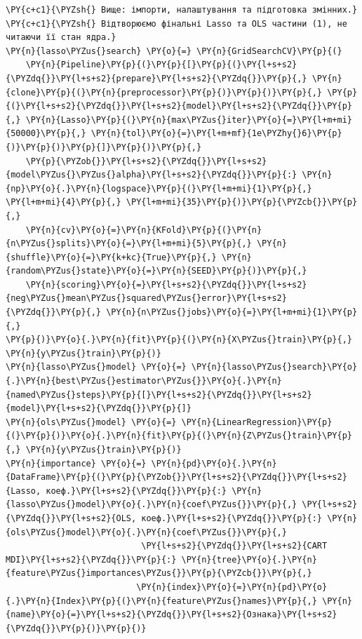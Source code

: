 \begin{Verbatim}[commandchars=\\\{\}]
\PY{c+c1}{\PYZsh{} Вище: імпорти, налаштування та підготовка змінних.}
\PY{c+c1}{\PYZsh{} Відтворюємо фінальні Lasso та OLS частини (1), не читаючи її стан ядра.}
\PY{n}{lasso\PYZus{}search} \PY{o}{=} \PY{n}{GridSearchCV}\PY{p}{(}
    \PY{n}{Pipeline}\PY{p}{(}\PY{p}{[}\PY{p}{(}\PY{l+s+s2}{\PYZdq{}}\PY{l+s+s2}{prepare}\PY{l+s+s2}{\PYZdq{}}\PY{p}{,} \PY{n}{clone}\PY{p}{(}\PY{n}{preprocessor}\PY{p}{)}\PY{p}{)}\PY{p}{,} \PY{p}{(}\PY{l+s+s2}{\PYZdq{}}\PY{l+s+s2}{model}\PY{l+s+s2}{\PYZdq{}}\PY{p}{,} \PY{n}{Lasso}\PY{p}{(}\PY{n}{max\PYZus{}iter}\PY{o}{=}\PY{l+m+mi}{50000}\PY{p}{,} \PY{n}{tol}\PY{o}{=}\PY{l+m+mf}{1e\PYZhy{}6}\PY{p}{)}\PY{p}{)}\PY{p}{]}\PY{p}{)}\PY{p}{,}
    \PY{p}{\PYZob{}}\PY{l+s+s2}{\PYZdq{}}\PY{l+s+s2}{model\PYZus{}\PYZus{}alpha}\PY{l+s+s2}{\PYZdq{}}\PY{p}{:} \PY{n}{np}\PY{o}{.}\PY{n}{logspace}\PY{p}{(}\PY{l+m+mi}{1}\PY{p}{,} \PY{l+m+mi}{4}\PY{p}{,} \PY{l+m+mi}{35}\PY{p}{)}\PY{p}{\PYZcb{}}\PY{p}{,}
    \PY{n}{cv}\PY{o}{=}\PY{n}{KFold}\PY{p}{(}\PY{n}{n\PYZus{}splits}\PY{o}{=}\PY{l+m+mi}{5}\PY{p}{,} \PY{n}{shuffle}\PY{o}{=}\PY{k+kc}{True}\PY{p}{,} \PY{n}{random\PYZus{}state}\PY{o}{=}\PY{n}{SEED}\PY{p}{)}\PY{p}{,}
    \PY{n}{scoring}\PY{o}{=}\PY{l+s+s2}{\PYZdq{}}\PY{l+s+s2}{neg\PYZus{}mean\PYZus{}squared\PYZus{}error}\PY{l+s+s2}{\PYZdq{}}\PY{p}{,} \PY{n}{n\PYZus{}jobs}\PY{o}{=}\PY{l+m+mi}{1}\PY{p}{,}
\PY{p}{)}\PY{o}{.}\PY{n}{fit}\PY{p}{(}\PY{n}{X\PYZus{}train}\PY{p}{,} \PY{n}{y\PYZus{}train}\PY{p}{)}
\PY{n}{lasso\PYZus{}model} \PY{o}{=} \PY{n}{lasso\PYZus{}search}\PY{o}{.}\PY{n}{best\PYZus{}estimator\PYZus{}}\PY{o}{.}\PY{n}{named\PYZus{}steps}\PY{p}{[}\PY{l+s+s2}{\PYZdq{}}\PY{l+s+s2}{model}\PY{l+s+s2}{\PYZdq{}}\PY{p}{]}
\PY{n}{ols\PYZus{}model} \PY{o}{=} \PY{n}{LinearRegression}\PY{p}{(}\PY{p}{)}\PY{o}{.}\PY{n}{fit}\PY{p}{(}\PY{n}{Z\PYZus{}train}\PY{p}{,} \PY{n}{y\PYZus{}train}\PY{p}{)}
\PY{n}{importance} \PY{o}{=} \PY{n}{pd}\PY{o}{.}\PY{n}{DataFrame}\PY{p}{(}\PY{p}{\PYZob{}}\PY{l+s+s2}{\PYZdq{}}\PY{l+s+s2}{Lasso, коеф.}\PY{l+s+s2}{\PYZdq{}}\PY{p}{:} \PY{n}{lasso\PYZus{}model}\PY{o}{.}\PY{n}{coef\PYZus{}}\PY{p}{,} \PY{l+s+s2}{\PYZdq{}}\PY{l+s+s2}{OLS, коеф.}\PY{l+s+s2}{\PYZdq{}}\PY{p}{:} \PY{n}{ols\PYZus{}model}\PY{o}{.}\PY{n}{coef\PYZus{}}\PY{p}{,}
                           \PY{l+s+s2}{\PYZdq{}}\PY{l+s+s2}{CART MDI}\PY{l+s+s2}{\PYZdq{}}\PY{p}{:} \PY{n}{tree}\PY{o}{.}\PY{n}{feature\PYZus{}importances\PYZus{}}\PY{p}{\PYZcb{}}\PY{p}{,}
                          \PY{n}{index}\PY{o}{=}\PY{n}{pd}\PY{o}{.}\PY{n}{Index}\PY{p}{(}\PY{n}{feature\PYZus{}names}\PY{p}{,} \PY{n}{name}\PY{o}{=}\PY{l+s+s2}{\PYZdq{}}\PY{l+s+s2}{Ознака}\PY{l+s+s2}{\PYZdq{}}\PY{p}{)}\PY{p}{)}

\end{Verbatim}
